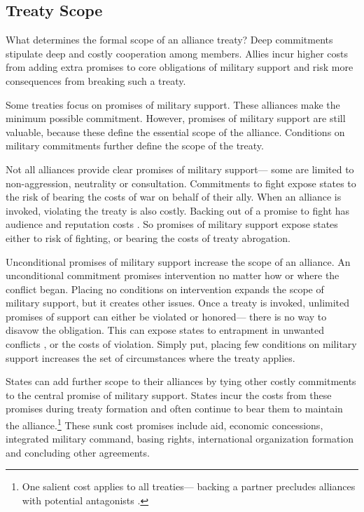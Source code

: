 \documentclass[12pt]{article}
\begin{document}
\subsection{Treaty Scope}


What determines the formal scope of an alliance treaty? 
Deep commitments stipulate deep and costly cooperation among members.
Allies incur higher costs from adding extra promises to core obligations of military support and risk more consequences from breaking such a treaty. 


Some treaties focus on promises of military support. 
These alliances make the minimum possible commitment. 
However, promises of military support are still valuable, because these define the essential scope of the alliance.  
Conditions on military commitments further define the scope of the treaty. 


Not all alliances provide clear promises of military support--- some are limited to non-aggression, neutrality or consultation. 
Commitments to fight expose states to the risk of bearing the costs of war on behalf of their ally. 
When an alliance is invoked, violating the treaty is also costly. 
Backing out of a promise to fight has audience \citep{Levyetal2015} and reputation costs \citep{Gibler2008, Crescenzietal2012, Mattes2012}. 
So promises of military support expose states either to risk of fighting, or bearing the costs of treaty abrogation. 


Unconditional promises of military support increase the scope of an alliance. 
An unconditional commitment promises intervention no matter how or where the conflict began. 
Placing no conditions on intervention expands the scope of military support, but it creates other issues. 
Once a treaty is invoked, unlimited promises of support can either be violated or honored--- there is no way to disavow the obligation. 
This can expose states to entrapment in unwanted conflicts \citep{Snyder1990, Benson2012}, or the costs of violation. 
Simply put, placing few conditions on military support increases the set of circumstances where the treaty applies.  


States can add further scope to their alliances by tying other costly commitments to the central promise of military support. 
States incur the costs from these promises during treaty formation and often continue to bear them to maintain the alliance.\footnote{
One salient cost applies to all treaties--- backing a partner precludes alliances with potential antagonists \citep{Snyder1997}.} 
These sunk cost promises include aid, economic concessions, integrated military command, basing rights, international organization formation and concluding other agreements. 
\end{document}
